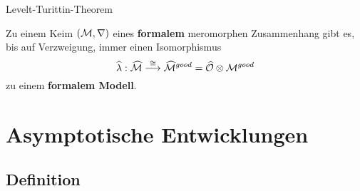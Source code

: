 \begin{frame}{Levelt-Turittin-Theorem}
  \begin{tthm}
    Zu einem Keim $(\mathcal{M},\nabla)$ eines \textbf{formalem} meromorphen
    Zusammenhang gibt es, bis auf Verzweigung, immer einen Isomorphismus
    \[
      \widehat\lambda:\widehat{\mathcal{M}}
      \overset{\cong}\longrightarrow
      \widehat{\mathcal{M}}^{good}
      =\widehat{\mathcal{O}}\otimes\mathcal{M}^{good}
    \]
    zu einem \textbf{formalem Modell}.
  \end{tthm}
\end{frame}

\section{Asymptotische Entwicklungen}
\subsection{Definition}
